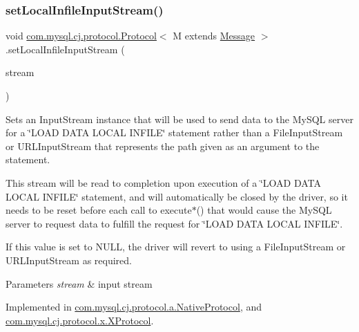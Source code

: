 \subsubsection{\texorpdfstring{set\+Local\+Infile\+Input\+Stream()}{setLocalInfileInputStream()}}
{\footnotesize\ttfamily void \mbox{\hyperlink{interfacecom_1_1mysql_1_1cj_1_1protocol_1_1_protocol}{com.\+mysql.\+cj.\+protocol.\+Protocol}}$<$ M extends \mbox{\hyperlink{interfacecom_1_1mysql_1_1cj_1_1protocol_1_1_message}{Message}} $>$.set\+Local\+Infile\+Input\+Stream (\begin{DoxyParamCaption}\item[{Input\+Stream}]{stream }\end{DoxyParamCaption})}

Sets an Input\+Stream instance that will be used to send data to the My\+S\+QL server for a \char`\"{}\+L\+O\+A\+D D\+A\+T\+A L\+O\+C\+A\+L I\+N\+F\+I\+L\+E\char`\"{} statement rather than a File\+Input\+Stream or U\+R\+L\+Input\+Stream that represents the path given as an argument to the statement.

This stream will be read to completion upon execution of a \char`\"{}\+L\+O\+A\+D D\+A\+T\+A L\+O\+C\+A\+L I\+N\+F\+I\+L\+E\char`\"{} statement, and will automatically be closed by the driver, so it needs to be reset before each call to execute$\ast$() that would cause the My\+S\+QL server to request data to fulfill the request for \char`\"{}\+L\+O\+A\+D D\+A\+T\+A L\+O\+C\+A\+L I\+N\+F\+I\+L\+E\char`\"{}.

If this value is set to N\+U\+LL, the driver will revert to using a File\+Input\+Stream or U\+R\+L\+Input\+Stream as required.


\begin{DoxyParams}{Parameters}
{\em stream} & input stream \\
\hline
\end{DoxyParams}


Implemented in \mbox{\hyperlink{classcom_1_1mysql_1_1cj_1_1protocol_1_1a_1_1_native_protocol_a366f28e9d5a564e582932d16ce9d778f}{com.\+mysql.\+cj.\+protocol.\+a.\+Native\+Protocol}}, and \mbox{\hyperlink{classcom_1_1mysql_1_1cj_1_1protocol_1_1x_1_1_x_protocol_a4f539adc72747ef03c94bc92acde5efb}{com.\+mysql.\+cj.\+protocol.\+x.\+X\+Protocol}}.

\mbox{\label{interfacecom_1_1mysql_1_1cj_1_1protocol_1_1_protocol_ace5604859b8b79df6dcf91bee7c1cc6c}} 
